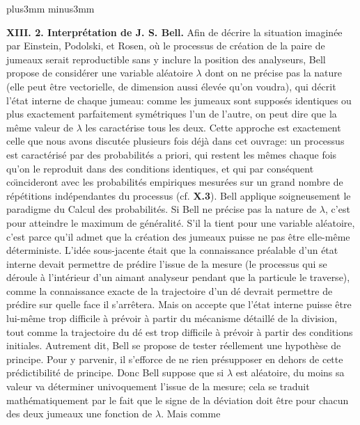 \vskip6mm plus3mm minus3mm 

{\bf XIII. 2. Interpr\'etation de J. S. Bell.}
\medskip 
Afin de d\'ecrire la situation imagin\'ee par Einstein, Podolski, et  
Rosen,  o\`u le processus de cr\'eation de la paire de jumeaux serait 
reproductible sans y inclure la position des  analyseurs, Bell propose de 
consid\'erer une variable al\'eatoire $\lambda$ dont on  ne pr\'ecise pas 
la nature (elle peut \^etre vectorielle, de dimension aussi \'elev\'ee 
qu'on voudra), qui d\'ecrit l'\'etat interne de chaque jumeau: comme les 
jumeaux sont suppos\'es identiques ou plus exactement parfaitement 
sym\'etriques l'un de  l'autre, on peut dire que la m\^eme valeur de 
$\lambda$ les caract\'erise tous les deux.  Cette approche est exactement
celle que nous avons discut\'ee plusieurs fois d\'ej\`a dans cet 
ouvrage: un processus est caract\'eris\'e par des probabilit\'es a priori, 
qui restent les m\^emes chaque fois qu'on le reproduit dans des conditions
identiques, et qui par cons\'equent co\"\i ncideront avec les probabilit\'es
empiriques mesur\'ees sur un grand nombre de r\'ep\'etitions ind\'ependantes 
du processus (cf. {\bf X.3}). Bell applique soigneusement le paradigme
du Calcul des probabilit\'es.
\medskip 
Si Bell ne pr\'ecise pas la nature de $\lambda$, c'est pour atteindre le 
maximum de g\'en\'eralit\'e. S'il la tient pour une variable al\'eatoire,  
c'est parce qu'il admet que la cr\'eation des jumeaux puisse ne pas   
\^etre  elle-m\^eme d\'eterministe.  L'id\'ee sous-jacente \'etait que  
la connaissance pr\'ealable d'un \'etat interne devait permettre de  
pr\'edire l'issue de la mesure (le processus qui se d\'eroule \`a 
l'int\'erieur d'un aimant analyseur pendant que la particule le traverse), 
comme la connaissance exacte de la trajectoire d'un d\'e devrait 
permettre de pr\'edire sur quelle face il s'arr\^etera. Mais on accepte   
que l'\'etat interne puisse  \^etre lui-m\^eme trop difficile \`a pr\'evoir  
\`a partir du m\'ecanisme d\'etaill\'e de la division, tout comme la 
trajectoire du d\'e est trop difficile \`a pr\'evoir \`a partir des  
conditions initiales. 
\medskip
Autrement dit,  Bell se propose de tester r\'eellement une hypoth\`ese
de principe.  Pour y parvenir,  il s'efforce de ne rien pr\'esupposer
en dehors de cette pr\'edictibilit\'e de principe. 
\medskip
Donc Bell suppose que si $\lambda$ est al\'eatoire, du moins sa valeur   
va d\'eterminer univoquement l'issue de la mesure; cela se traduit 
math\'ematiquement par le fait que le signe de la d\'eviation doit \^etre  
pour chacun des deux jumeaux une fonction de $\lambda$. Mais comme  
